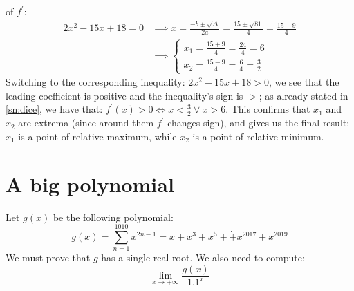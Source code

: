 of $f^\prime$:
\begin{equation*}
    \begin{split}
        2x^2 - 15x + 18 = 0 &\implies x = \frac{-b \pm \sqrt{\Delta}}{2a} =
        \frac{15 \pm \sqrt{81}}{4} = \frac{15 \pm 9}{4}\\
        &\implies
        \begin{cases}
            x_1 = \frac{15 + 9}{4} = \frac{24}{4} = 6\\
            x_2 = \frac{15 - 9}{4} = \frac{6}{4} = \frac{3}{2}
        \end{cases}
    \end{split}
\end{equation*}
Switching to the corresponding inequality: $2x^2 - 15x + 18 > 0$, we see that
the leading coefficient is positive and the inequality's sign is $>$; as
already stated in \ref{sn:dice}, we have
that: $f^\prime(x) > 0 \iff x < \frac{3}{2} \vee x > 6$.
This confirms that $x_1$ and $x_2$ are extrema (since around them $f^\prime$ changes sign),
and gives us the final result: $x_1$ is a point of relative maximum, while $x_2$ is
a point of relative minimum.

\section{A big polynomial}
\label{sec:bigpoly}
Let $g(x)$ be the following polynomial:
\begin{equation*}
    g(x) = \sum_{n = 1}^{1010} x^{2n-1} = x + x^3 + x^5 + \dot + x^{2017} + x^{2019}
\end{equation*}
We must prove that $g$ has a single real root. We also need to compute:
\begin{equation}\label{eq:limfracpolyexp}
    \lim_{x \to +\infty} \frac{g(x)}{1.1^x}
\end{equation}

